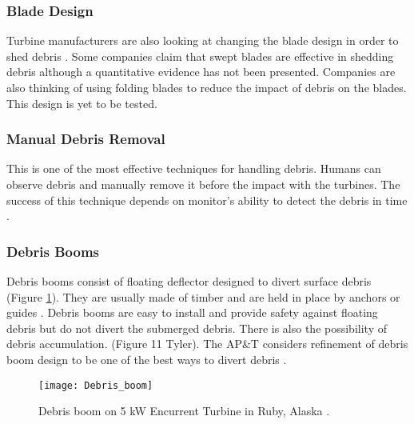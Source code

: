 \subsubsection{Blade Design}
Turbine manufacturers are also looking at changing the blade design in order to shed debris \citep{Reference1}. Some companies claim that swept blades are effective in shedding debris although a quantitative evidence has not been presented. Companies are also thinking of using folding blades to reduce the impact of debris on the blades. This design is yet to be tested.
\subsubsection{Manual Debris Removal}
This is one of the most effective techniques for handling debris. Humans can observe debris and manually remove it before the impact with the turbines. The success of this technique depends on monitor's ability to detect the debris in time \citep{Reference1}.
\subsubsection{Debris Booms}
Debris booms consist of floating deflector designed to divert surface debris (Figure \ref{fig:Debris_boom}). They are usually made of timber and are held in place by anchors or guides \citep{Reference5}. Debris booms are easy to install and provide safety against floating debris but do not divert the submerged debris. There is also the possibility of debris accumulation. (Figure 11 Tyler). The AP\&T considers refinement of debris boom design to be one of the best ways to divert debris \citep{Reference1}.  
\begin{figure}
\centering
\texttt{[image: Debris\_boom]}
\caption{\label{fig:Debris_boom}Debris boom on 5 kW Encurrent Turbine in Ruby, Alaska \citep{Reference1}.}
\end{figure}



















